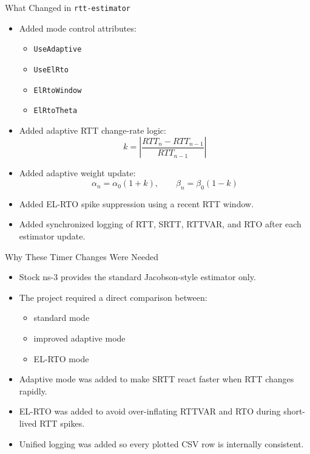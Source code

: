 \documentclass[aspectratio=169]{beamer}
\begin{document}
\begin{frame}{What Changed in \texttt{rtt-estimator}}
  \begin{itemize}
    \item Added mode control attributes:
    \begin{itemize}
      \item \texttt{UseAdaptive}
      \item \texttt{UseElRto}
      \item \texttt{ElRtoWindow}
      \item \texttt{ElRtoTheta}
    \end{itemize}
    \item Added adaptive RTT change-rate logic:
    \[
      k = \left| \frac{RTT_n - RTT_{n-1}}{RTT_{n-1}} \right|
    \]
    \item Added adaptive weight update:
    \[
      \alpha_n = \alpha_0 (1 + k), \qquad \beta_n = \beta_0 (1 - k)
    \]
    \item Added EL-RTO spike suppression using a recent RTT window.
    \item Added synchronized logging of RTT, SRTT, RTTVAR, and RTO after each estimator update.
  \end{itemize}
\end{frame}

\begin{frame}{Why These Timer Changes Were Needed}
  \begin{itemize}
    \item Stock ns-3 provides the standard Jacobson-style estimator only.
    \item The project required a direct comparison between:
    \begin{itemize}
      \item standard mode
      \item improved adaptive mode
      \item EL-RTO mode
    \end{itemize}
    \item Adaptive mode was added to make SRTT react faster when RTT changes rapidly.
    \item EL-RTO was added to avoid over-inflating RTTVAR and RTO during short-lived RTT spikes.
    \item Unified logging was added so every plotted CSV row is internally consistent.
  \end{itemize}
\end{frame}
\end{document}
